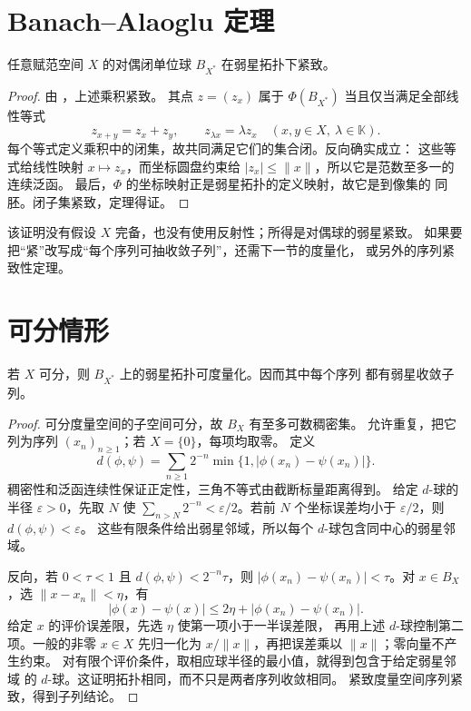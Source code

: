 \section{Banach--Alaoglu 定理}

\begin{theorem}\label{thm:banach-alaoglu}
任意赋范空间 \(X\) 的对偶闭单位球 \(B_{X^*}\) 在弱星拓扑下紧致。
\end{theorem}
\begin{proof}
由 ，上述乘积紧致。
其点 \(z=(z_x)\) 属于 \(\Phi(B_{X^*})\) 当且仅当满足全部线性等式
\[
 z_{x+y}=z_x+z_y,\qquad z_{\lambda x}=\lambda z_x
 \quad(x,y\in X,\ \lambda\in\mathbb K).
\]
每个等式定义乘积中的闭集，故共同满足它们的集合闭。反向确实成立：
这些等式给线性映射 \(x\mapsto z_x\)，而坐标圆盘约束给
\(|z_x|\le\|x\|\)，所以它是范数至多一的连续泛函。
最后，\(\Phi\) 的坐标映射正是弱星拓扑的定义映射，故它是到像集的
同胚。闭子集紧致，定理得证。
\end{proof}

该证明没有假设 \(X\) 完备，也没有使用反射性；所得是对偶球的弱星紧致。
如果要把“紧”改写成“每个序列可抽收敛子列”，还需下一节的度量化，
或另外的序列紧致性定理。

\section{可分情形}

\begin{theorem}\label{thm:weakstar-metrizable-ball}
若 \(X\) 可分，则 \(B_{X^*}\) 上的弱星拓扑可度量化。因而其中每个序列
都有弱星收敛子列。
\end{theorem}
\begin{proof}
可分度量空间的子空间可分，故 \(B_X\) 有至多可数稠密集。
允许重复，把它列为序列 \((x_n)_{n\ge1}\)；若 \(X=\{0\}\)，每项均取零。
定义
\[
 d(\phi,\psi)=\sum_{n\ge1}2^{-n}
       \min\{1,|\phi(x_n)-\psi(x_n)|\}.
\]
稠密性和泛函连续性保证正定性，三角不等式由截断标量距离得到。
给定 \(d\)-球的半径 \(\varepsilon>0\)，先取 \(N\) 使
\(\sum_{n>N}2^{-n}<\varepsilon/2\)。若前 \(N\) 个坐标误差均小于
\(\varepsilon/2\)，则 \(d(\phi,\psi)<\varepsilon\)。
这些有限条件给出弱星邻域，所以每个 \(d\)-球包含同中心的弱星邻域。

反向，若 \(0<\tau<1\) 且 \(d(\phi,\psi)<2^{-n}\tau\)，则
\(|\phi(x_n)-\psi(x_n)|<\tau\)。对 \(x\in B_X\)，选
\(\|x-x_n\|<\eta\)，有
\[
 |\phi(x)-\psi(x)|\le2\eta+|\phi(x_n)-\psi(x_n)|.
\]
给定 \(x\) 的评价误差限，先选 \(\eta\) 使第一项小于一半误差限，
再用上述 \(d\)-球控制第二项。一般的非零 \(x\in X\) 先归一化为
\(x/\|x\|\)，再把误差乘以 \(\|x\|\)；零向量不产生约束。
对有限个评价条件，取相应球半径的最小值，就得到包含于给定弱星邻域
的 \(d\)-球。这证明拓扑相同，而不只是两者序列收敛相同。
紧致度量空间序列紧致，得到子列结论。
\end{proof}

